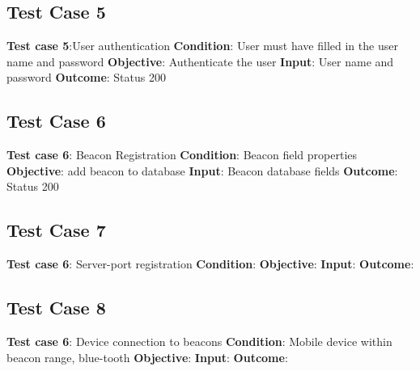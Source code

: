 \documentclass[11pt]{article}
\begin{document}
\subsection{Test Case 5}
\textbf{Test case 5}:User authentication  \newline
\textbf{Condition}: User must have filled in the user name and password \newline
\textbf{Objective}: Authenticate the user \newline
\textbf{Input}: User name and password \newline
\textbf{Outcome}: Status 200  \newline

\subsection{Test Case 6}
\textbf{Test case 6}: Beacon Registration \newline
\textbf{Condition}: Beacon field properties  \newline
\textbf{Objective}: add beacon to database  \newline
\textbf{Input}: Beacon database fields \newline
\textbf{Outcome}:  Status 200 \newline

\subsection{Test Case 7}
\textbf{Test case 6}: Server-port registration \newline
\textbf{Condition}:  \newline
\textbf{Objective}:   \newline
\textbf{Input}:  \newline
\textbf{Outcome}:   \newline

\subsection{Test Case 8}
\textbf{Test case 6}: Device connection to beacons \newline
\textbf{Condition}: Mobile device within beacon range, blue-tooth \newline
\textbf{Objective}:  \newline
\textbf{Input}:  \newline
\textbf{Outcome}:   \newline
\end{document}
